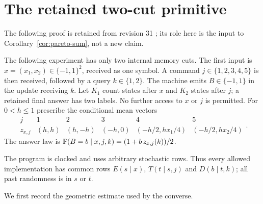 \section{The retained two-cut primitive}
\label{sec:primitive}
The following proof is retained from revision 31 \cite{GTF31}; its role
here is the input to Corollary~\ref{cor:pareto-sum}, not a new claim.

The following experiment has only two internal memory cuts. The first
input is $x=(x_1,x_2)\in\{-1,1\}^2$, received as one symbol. A command
$j\in\{1,2,3,4,5\}$ is then received, followed by a query $k\in\{1,2\}$.
The machine emits $B\in\{-1,1\}$ in the update receiving $k$. Let $K_1$
count states after $x$ and $K_2$ states after $j$; a retained final answer
has two labels. No further access to $x$ or $j$ is permitted. For
$0<h\le1$ prescribe the conditional mean vectors
\begin{equation}\label{eq:primitive}
\begin{array}{c|ccccc}
j&1&2&3&4&5\\\hline
z_{x,j}&(h,h)&(h,-h)&(-h,0)&(-h/2,hx_1/4)&(-h/2,hx_2/4)
\end{array}.
\end{equation}
The answer law is $\mathbb P(B=b\mid x,j,k)=(1+b\,z_{x,j}(k))/2$.

The program is clocked and uses arbitrary stochastic rows. Thus every
allowed implementation has common rows $E(s\mid x)$, $T(t\mid s,j)$
and $D(b\mid t,k)$; all past randomness is in $s$ or $t$.

We first record the geometric estimate used by the converse.

